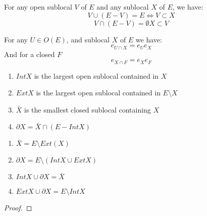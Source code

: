 \begin{lemma}
    \label{lem:properties_of_complements_part_2}
    For any open sublocal $V$ of $E$ and any sublocal $X$ of $E$, we have:
    \[V \cup (E - V) = E \iff V \subset X \]
    \[V \cap (E - V) = \emptyset X \subset V\]
\end{lemma}


\begin{lemma}
    \label{lem:open_closed_intersection}
    For any $U \in O(E)$, and sublocal $X$ of $E$ we have:
    \[e_{U \cap X} = e_Ue_X\]
    And for a closed $F$
    \[e_{X \cap F} = e_Xe_F\]
\end{lemma}

\begin{comment}
\begin{lemma}[(1.11) Distribution of Intersections over Unions]
    \label{lem:distribution_of_intersections_over_unions}
    \uses{lem:open_closed_intersection}
    Let $X, Y, L$ be three sub locals of $E$. If $L$ is open or closed, we have:
    \[L \cap (X \cap Y) = (L \cap X) \cup (L \cap Y)\]
\end{lemma}
\end{comment}
\begin{definition}
    \label{def:further_topology}
    \leanok
    \begin{enumerate}
        \item $Int X$ is the largest open sublocal contained in $X$
        \item $Ext X$ is the largest open sublocal contained in $E \setminus X$
        \item $\bar{X}$ is the smallest closed sublocal containing $X$
        \item $\partial X = \bar{X} \cap (E - Int X)$
    \end{enumerate}
\end{definition}

\begin{lemma} 
    \label{lem:properties_of_further_topology}
    \leanok
    \begin{enumerate}
        \item $\bar{X} = E \setminus Ext(X)$
        \item $\partial X = E \setminus (Int X \cup Ext X)$
        \item $Int X \cup \partial X = \bar X$
        \item $Ext X \cup \partial X = E \setminus Int X$
    \end{enumerate}
\end{lemma}

\begin{proof}
\end{proof}


